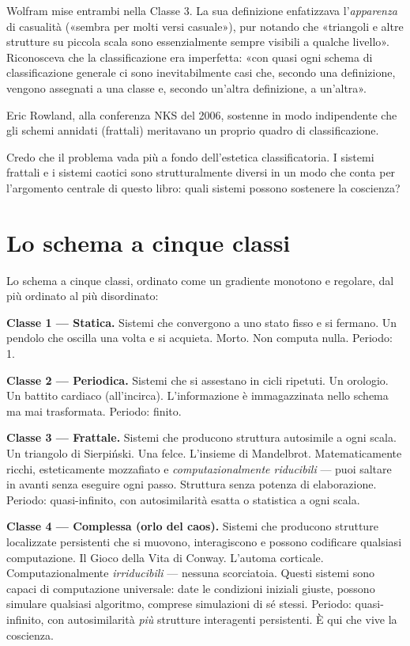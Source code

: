 \documentclass[11pt, twoside, openright]{book}
\begin{document}
Wolfram mise entrambi nella Classe 3. La sua definizione enfatizzava l'\textit{apparenza} di casualità («sembra per molti versi casuale»), pur notando che «triangoli e altre strutture su piccola scala sono essenzialmente sempre visibili a qualche livello». Riconosceva che la classificazione era imperfetta: «con quasi ogni schema di classificazione generale ci sono inevitabilmente casi che, secondo una definizione, vengono assegnati a una classe e, secondo un'altra definizione, a un'altra».

Eric Rowland, alla conferenza NKS del 2006, sostenne in modo indipendente che gli schemi annidati (frattali) meritavano un proprio quadro di classificazione.

Credo che il problema vada più a fondo dell'estetica classificatoria. I sistemi frattali e i sistemi caotici sono strutturalmente diversi in un modo che conta per l'argomento centrale di questo libro: quali sistemi possono sostenere la coscienza?

\section*{Lo schema a cinque classi}

Lo schema a cinque classi, ordinato come un gradiente monotono e regolare, dal più ordinato al più disordinato:

\textbf{Classe 1 --- Statica.} Sistemi che convergono a uno stato fisso e si fermano. Un pendolo che oscilla una volta e si acquieta. Morto. Non computa nulla. Periodo: 1.

\textbf{Classe 2 --- Periodica.} Sistemi che si assestano in cicli ripetuti. Un orologio. Un battito cardiaco (all'incirca). L'informazione è immagazzinata nello schema ma mai trasformata. Periodo: finito.

\textbf{Classe 3 --- Frattale.} Sistemi che producono struttura autosimile a ogni scala. Un triangolo di Sierpiński. Una felce. L'insieme di Mandelbrot. Matematicamente ricchi, esteticamente mozzafiato e \textit{computazionalmente riducibili} --- puoi saltare in avanti senza eseguire ogni passo. Struttura senza potenza di elaborazione. Periodo: quasi-infinito, con autosimilarità esatta o statistica a ogni scala.

\textbf{Classe 4 --- Complessa (orlo del caos).} Sistemi che producono strutture localizzate persistenti che si muovono, interagiscono e possono codificare qualsiasi computazione. Il Gioco della Vita di Conway. L'automa corticale. Computazionalmente \textit{irriducibili} --- nessuna scorciatoia. Questi sistemi sono capaci di computazione universale: date le condizioni iniziali giuste, possono simulare qualsiasi algoritmo, comprese simulazioni di sé stessi. Periodo: quasi-infinito, con autosimilarità \textit{più} strutture interagenti persistenti. È qui che vive la coscienza.
\end{document}
